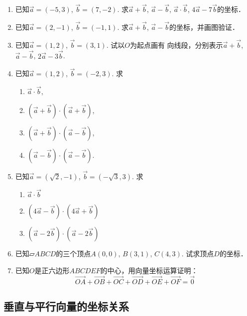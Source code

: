 \begin{ex}
\begin{enumerate}
    \item 已知$\vec{a}=(-5,3)$, $\vec{b}=(7,-2)$. 求$\vec{a}+\vec{b}$, $\vec{a}-\vec{b}$, $\vec{a}\cdot \vec{b}$, $4\vec{a}-7\vec{b}$的坐标．

    \item 已知$\vec{a}=(2,-1)$, $\vec{b}=(-1,1)$. 求$\vec{a}+\vec{b}$, 
    $\vec{a}-\vec{b}$的坐标，并画图验证．
    \item 已知$\vec{a}=(1,2)$, $\vec{b}=(3,1)$. 试以$O$为起点画有
    向线段，分别表示$\vec{a}+\vec{b}$, $\vec{a}-\vec{b}$, $2\vec{a}-3\vec{b}$.
    \item 已知$\vec{a}=(1,2)$, $\vec{b}=(-2,3)$. 求
\begin{multicols}{2}
\begin{enumerate}
    \item $\vec{a}\cdot \vec{b}$, 
    \item $(\vec{a}+\vec{b})\cdot (\vec{a}+\vec{b})$, 
    \item $(\vec{a}+\vec{b})\cdot (\vec{a}-\vec{b})$, 
    \item $(\vec{a}-\vec{b})\cdot (\vec{a}-\vec{b})$.
\end{enumerate}
\end{multicols}
    
\item 已知$\vec{a}=(\sqrt{2},-1)$, $\vec{b}=(-\sqrt{3},3)$. 求
\begin{multicols}{3}
  \begin{enumerate}
      \item $\vec{a}\cdot \vec{b}$
      \item $(4\vec{a}-\vec{b})\cdot (4\vec{a}+\vec{b})$
      \item $(\vec{a}-2\vec{b})\cdot (\vec{a}-2\vec{b})$
  \end{enumerate}  
\end{multicols}

\item 已知$\parallelogram{ABCD}$的三个顶点$A(0,0)$, $B(3,1)$, 
$C(4,3)$. 试求顶点$D$的坐标．
\item 已知$O$是正六边形$ABCDEF$的中心，用向量坐标运算证明：
\[\Vec{OA}+\Vec{OB}+\Vec{OC}+\Vec{OD}+\Vec{OE}+\Vec{OF}=\vec{0}\]
   \end{enumerate} 
\end{ex}

\subsection{垂直与平行向量的坐标关系}

